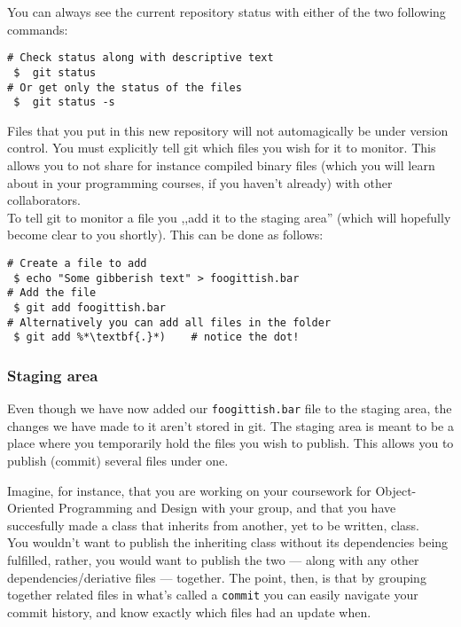 \documentclass[11pt,a4paper,oneside,final,titlepage]{article}
\begin{document}
You can always see the current repository status with either of the two following
commands:
\begin{lstlisting}[name=lst:status,caption=Check current repo's status,
                   label=lst:status,style=git]
# Check status along with descriptive text
 $  git status
# Or get only the status of the files
 $  git status -s
\end{lstlisting}

Files that you put in this new repository will not automagically be under
version control. You must explicitly tell git which files you wish for it to
monitor. This allows you to not share for instance compiled binary files
(which you will learn about in your programming courses, if you haven't already)
with other collaborators.\\
To tell git to monitor a file you ,,add it to the staging area'' (which will
hopefully become clear to you shortly). This can be done as follows:
\begin{lstlisting}[name=lst:addFiles,caption=Adding files to staging area,
                   label=lst:addFiles,style=git]
# Create a file to add
 $ echo "Some gibberish text" > foogittish.bar
# Add the file
 $ git add foogittish.bar
# Alternatively you can add all files in the folder
 $ git add %*\textbf{.}*)    # notice the dot!
\end{lstlisting}

\subsubsection{Staging area}
Even though we have now added our \lstinline[language=sh]{foogittish.bar} file
to the staging area, the changes we have made to it aren't stored in git.
The staging area is meant to be a place where you temporarily hold the files you
wish to publish. This allows you to publish (commit) several files under one.

Imagine, for instance, that you are working on your coursework for Object-Oriented
Programming and Design with your group, and that you have succesfully made a
class that inherits from another, yet to be written, class.\\
You wouldn't want to publish the inheriting class without its dependencies being
fulfilled, rather, you would want to publish the two --- along with any other
dependencies/deriative files --- together. The point, then, is that by grouping
together related files in what's called a \lstinline[style=git]{commit} you
can easily navigate your commit history, and know exactly which files had an
update when.
\end{document}
